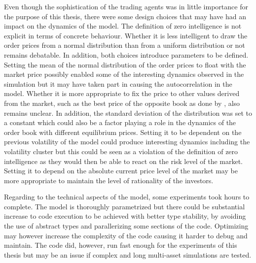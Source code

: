 Even though the sophistication of the trading agents was in little
importance for the purpose of this thesis, there were some design
choices that may have had an impact on the dynamics of the model.
The definition of zero intelligence is not explicit in terms of
concrete behaviour. Whether it is less intelligent to draw the
order prices from a normal distribution than from a uniform
distribution or not remains debatable. In addition, both choices
introduce parameters to be defined. Setting the mean of the
normal distribution of the order prices to float with the 
market price possibly enabled some of the interesting dynamics
observed in the simulation but it may have taken part in causing the
autocorrelation in the model. Whether it is more appropriate
to fix the price to other values derived from the market,
such as the best price of the opposite book as done by
\citet{Genoa01}, also remains unclear. In addition, the 
standard deviation of the distribution was set to a constant
which could also be a factor playing a role in the dynamics 
of the order book with different equilibrium prices. Setting
it to be dependent on the previous volatility of the model
could produce interesting dynamics including the volatility
cluster but this could be seen as a violation of the definition
of zero intelligence as they would then be able to react on the risk level
of the market. Setting it to depend on the absolute
current price level of the market may be more appropriate to 
maintain the level of rationality of the investors.  

Regarding to the technical aspects of the model, some experiments 
took hours to complete. The model is thoroughly parametrized but 
there could be substantial increase to code execution to be 
achieved with better type stability, by avoiding the use of 
abstract types and parallerizing some sections of the code. 
Optimizing may however increase the complexity of the code 
causing it harder to debug and maintain. The code did, however, 
run fast enough for the experiments of this thesis but may be 
an issue if complex and long multi-asset simulations are tested. 

